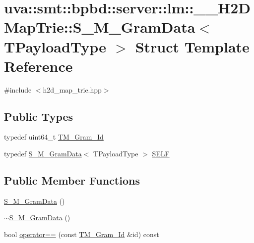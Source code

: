 \hypertarget{structuva_1_1smt_1_1bpbd_1_1server_1_1lm_1_1_____h2_d_map_trie_1_1_s___m___gram_data}{}\section{uva\+:\+:smt\+:\+:bpbd\+:\+:server\+:\+:lm\+:\+:\+\_\+\+\_\+\+H2\+D\+Map\+Trie\+:\+:S\+\_\+\+M\+\_\+\+Gram\+Data$<$ T\+Payload\+Type $>$ Struct Template Reference}
\label{structuva_1_1smt_1_1bpbd_1_1server_1_1lm_1_1_____h2_d_map_trie_1_1_s___m___gram_data}


{\ttfamily \#include $<$h2d\+\_\+map\+\_\+trie.\+hpp$>$}

\subsection*{Public Types}
\begin{DoxyCompactItemize}
\item 
typedef uint64\+\_\+t \hyperlink{structuva_1_1smt_1_1bpbd_1_1server_1_1lm_1_1_____h2_d_map_trie_1_1_s___m___gram_data_a306639499a99126a64e77b6c254a3651}{T\+M\+\_\+\+Gram\+\_\+\+Id}
\item 
typedef \hyperlink{structuva_1_1smt_1_1bpbd_1_1server_1_1lm_1_1_____h2_d_map_trie_1_1_s___m___gram_data}{S\+\_\+\+M\+\_\+\+Gram\+Data}$<$ T\+Payload\+Type $>$ \hyperlink{structuva_1_1smt_1_1bpbd_1_1server_1_1lm_1_1_____h2_d_map_trie_1_1_s___m___gram_data_a4750400269782e74ff27b2c7da8e684d}{S\+E\+L\+F}
\end{DoxyCompactItemize}
\subsection*{Public Member Functions}
\begin{DoxyCompactItemize}
\item 
\hyperlink{structuva_1_1smt_1_1bpbd_1_1server_1_1lm_1_1_____h2_d_map_trie_1_1_s___m___gram_data_a767ff40ef1df9a405fc3585d935c7ed3}{S\+\_\+\+M\+\_\+\+Gram\+Data} ()
\item 
\hyperlink{structuva_1_1smt_1_1bpbd_1_1server_1_1lm_1_1_____h2_d_map_trie_1_1_s___m___gram_data_a97d9bb86ec8c87fd05d3af93f910de3e}{$\sim$\+S\+\_\+\+M\+\_\+\+Gram\+Data} ()
\item 
bool \hyperlink{structuva_1_1smt_1_1bpbd_1_1server_1_1lm_1_1_____h2_d_map_trie_1_1_s___m___gram_data_a2a451077c4c48ed4b6c72d85b5f5dcb4}{operator==} (const \hyperlink{structuva_1_1smt_1_1bpbd_1_1server_1_1lm_1_1_____h2_d_map_trie_1_1_s___m___gram_data_a306639499a99126a64e77b6c254a3651}{T\+M\+\_\+\+Gram\+\_\+\+Id} \&id) const 
\end{DoxyCompactItemize}

